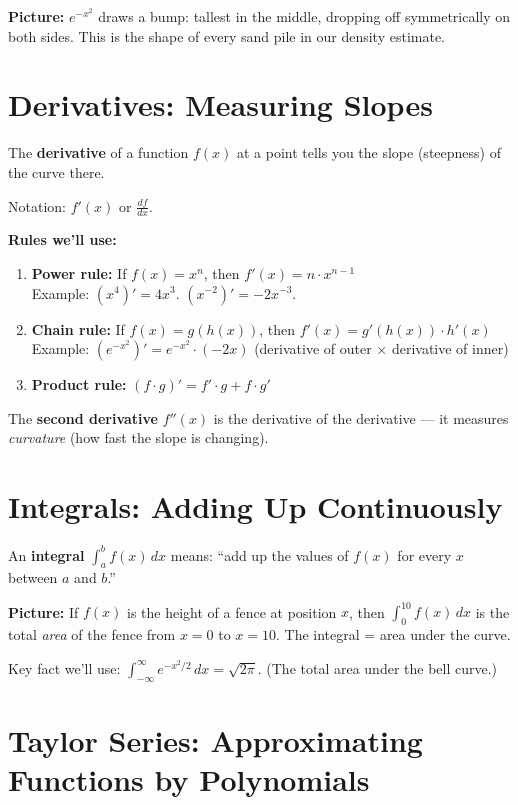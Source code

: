 \documentclass[12pt]{article}
\newcommand{\realworld}[1]{\begin{tcolorbox}[colback=green!5,colframe=green!50!black,breakable]\textbf{Picture:} #1\end{tcolorbox}}
\begin{document}
\realworld{$e^{-x^2}$ draws a bump: tallest in the middle, dropping off symmetrically on both sides. This is the shape of every sand pile in our density estimate.}

\section{Derivatives: Measuring Slopes}

The \textbf{derivative} of a function $f(x)$ at a point tells you the slope (steepness) of the curve there.

Notation: $f'(x)$ or $\frac{df}{dx}$.

\textbf{Rules we'll use:}
\begin{enumerate}
\item \textbf{Power rule:} If $f(x) = x^n$, then $f'(x) = n \cdot x^{n-1}$\\
Example: $(x^4)' = 4x^3$. $(x^{-2})' = -2x^{-3}$.
\item \textbf{Chain rule:} If $f(x) = g(h(x))$, then $f'(x) = g'(h(x)) \cdot h'(x)$\\
Example: $(e^{-x^2})' = e^{-x^2} \cdot (-2x)$ (derivative of outer $\times$ derivative of inner)
\item \textbf{Product rule:} $(f \cdot g)' = f' \cdot g + f \cdot g'$
\end{enumerate}

The \textbf{second derivative} $f''(x)$ is the derivative of the derivative --- it measures \emph{curvature} (how fast the slope is changing).

\section{Integrals: Adding Up Continuously}

An \textbf{integral} $\int_a^b f(x)\,dx$ means: ``add up the values of $f(x)$ for every $x$ between $a$ and $b$.''

\realworld{If $f(x)$ is the height of a fence at position $x$, then $\int_0^{10} f(x)\,dx$ is the total \emph{area} of the fence from $x=0$ to $x=10$. The integral = area under the curve.}

Key fact we'll use: $\int_{-\infty}^{\infty} e^{-x^2/2}\,dx = \sqrt{2\pi}$. (The total area under the bell curve.)

\section{Taylor Series: Approximating Functions by Polynomials}
\end{document}
